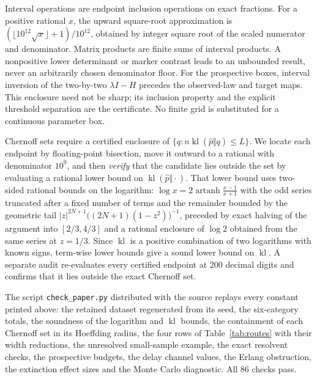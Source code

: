 \documentclass[11pt]{article}
\theoremstyle{definition}
\newcommand{\kl}{\operatorname{kl}}
\begin{document}
Interval operations are endpoint inclusion operations on exact fractions. For a
positive rational $x$, the upward square-root approximation is
$(\lfloor10^{12}\sqrt{x}\rfloor+1)/10^{12}$, obtained by integer square root of
the scaled numerator and denominator. Matrix products are finite sums of
interval products. A nonpositive lower determinant or marker contrast leads to
an unbounded result, never an arbitrarily chosen denominator floor. For the
prospective boxes, interval inversion of the two-by-two $\lambda I-H$ precedes
the observed-law and target maps. This enclosure need not be sharp; its
inclusion property and the explicit threshold separation are the certificate. No
finite grid is substituted for a continuous parameter box.

Chernoff sets require a certified enclosure of $\{q:n\kl(\hat p\Vert q)\le L\}$.
We locate each endpoint by floating-point bisection, move it outward to a
rational with denominator $10^{9}$, and then \emph{verify} that the candidate
lies outside the set by evaluating a rational lower bound on
$\kl(\hat p\Vert\cdot)$. That lower bound uses two-sided rational bounds on the
logarithm: $\log x=2\operatorname{artanh}\frac{x-1}{x+1}$ with the odd series
truncated after a fixed number of terms and the remainder bounded by the
geometric tail
$|z|^{2N+1}\bigl((2N+1)(1-z^2)\bigr)^{-1}$, preceded by exact halving of the
argument into $[2/3,4/3]$ and a rational enclosure of $\log2$ obtained from the
same series at $z=1/3$. Since $\kl$ is a positive combination of two logarithms
with known signs, term-wise lower bounds give a sound lower bound on $\kl$. A
separate audit re-evaluates every certified endpoint at 200 decimal digits and
confirms that it lies outside the exact Chernoff set.

The script \texttt{check\_paper.py} distributed with the source replays every
constant printed above: the retained dataset regenerated from its seed, the
six-category totals, the soundness of the logarithm and $\kl$ bounds, the
containment of each Chernoff set in its Hoeffding radius, the four rows of
Table~\ref{tab:routes} with their width reductions, the unresolved small-sample
example, the exact resolvent checks, the prospective budgets, the delay channel
values, the Erlang obstruction, the extinction effect sizes and the Monte Carlo
diagnostic. All 86 checks pass.
\end{document}
